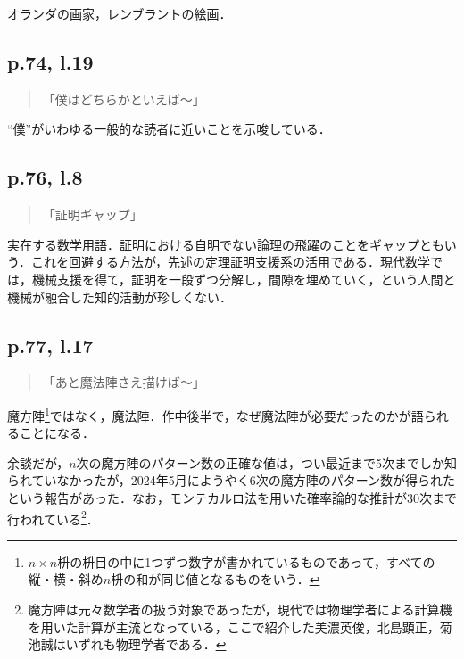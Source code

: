 \documentclass[10pt, a5paper, twoside]{jsarticle}
\theoremstyle{definition}
\begin{document}
			オランダの画家，レンブラントの絵画．

		\subsection{p.74, l.19}

			\begin{quote}

				「僕はどちらかといえば〜」
				
			\end{quote}

			“僕”がいわゆる一般的な読者に近いことを示唆している．

		\subsection{p.76, l.8}

			\begin{quote}

				「証明ギャップ」
			
			\end{quote}

			実在する数学用語．証明における自明でない論理の飛躍のことをギャップともいう．これを回避する方法が，先述の定理証明支援系の活用である．現代数学では，機械支援を得て，証明を一段ずつ分解し，間隙を埋めていく，という人間と機械が融合した知的活動が珍しくない．

		\subsection{p.77, l.17}

			\begin{quote}

				「あと魔法陣さえ描けば〜」
				
			\end{quote}

			魔方陣\footnote{$n\times n$枡の枡目の中に1つずつ数字が書かれているものであって，すべての縦・横・斜め$n$枡の和が同じ値となるものをいう．}ではなく，魔法陣．作中後半で，なぜ魔法陣が必要だったのかが語られることになる．

			余談だが，$n$次の魔方陣のパターン数の正確な値は，つい最近まで5次までしか知られていなかったが，2024年5月にようやく6次の魔方陣のパターン数が得られたという報告\cite{mino}があった．なお，モンテカルロ法を用いた確率論的な推計が30次まで行われている\cite{ktj}\footnote{魔方陣は元々数学者の扱う対象であったが，現代では物理学者による計算機を用いた計算が主流となっている，ここで紹介した美濃英俊，北島顕正，菊池誠はいずれも物理学者である．}．
\end{document}
